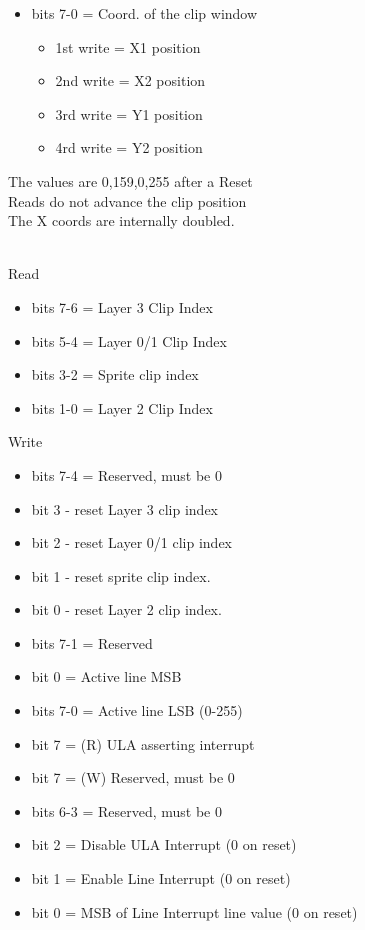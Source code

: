 \begin{itemize}
\item bits 7-0 = Coord. of the clip window
  \begin{itemize}
  \item[] 1st write = X1 position
  \item[] 2nd write = X2 position
  \item[] 3rd write = Y1 position
  \item[] 4rd write = Y2 position
  \end{itemize}
\end{itemize}
The values are 0,159,0,255 after a Reset\\
Reads do not advance the clip position\\
The X coords are internally doubled.

\\
Read
\begin{itemize}
\item bits 7-6 = Layer 3 Clip Index
\item bits 5-4 = Layer 0/1 Clip Index
\item bits 3-2 = Sprite clip index
\item bits 1-0 = Layer 2 Clip Index
\end{itemize}
Write
\begin{itemize}
\item bits 7-4 = Reserved, must be 0
\item bit 3 - reset Layer 3 clip index
\item bit 2 - reset Layer 0/1 clip index
\item bit 1 - reset sprite clip index.
\item bit 0 - reset Layer 2 clip index.
\end{itemize}

\begin{itemize}
\item bits 7-1 = Reserved
\item bit 0 = Active line MSB
\end{itemize}

\begin{itemize}
\item bits 7-0 = Active line LSB (0-255)
\end{itemize}

\begin{itemize}
\item bit 7 = (R) ULA asserting interrupt
\item bit 7 = (W) Reserved, must be 0
\item bits 6-3 = Reserved, must be 0
\item bit 2 = Disable ULA Interrupt (0 on reset)
\item bit 1 = Enable Line Interrupt (0 on reset)
\item bit 0 = MSB of Line Interrupt line value (0 on reset)
\end{itemize}

